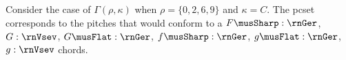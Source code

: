 
Consider the case of $\Gamma(\rho, \kappa)$ when $\rho =
\{0, 2, 6, 9\}$ and $\kappa = C$. The \gls{pcset}
corresponds to the pitches that would conform to a
$F\musSharp:\rnGer$, $G:\rnVsev$, $G\musFlat:\rnGer$,
$f\musSharp:\rnGer$, $g\musFlat:\rnGer$, $g:\rnVsev$ chords.
